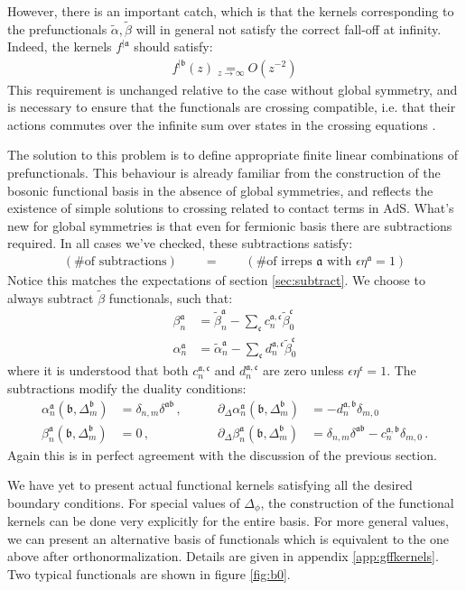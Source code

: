 \documentclass[12pt]{article}
\numberwithin{equation}{section}
\newcommand{\bea}{\begin{eqnarray}}
\newcommand{\eea}{\end{eqnarray}}
\newcommand{\ba}{\begin{equation}\begin{aligned}}
\newcommand{\ea}{\end{aligned}\end{equation}}
\newcommand{\Df}{{\Delta_\phi}}
\newcommand{\mf}[1]{\mathfrak #1}
\begin{document}
	However, there is an important catch, which is that the kernels corresponding to the prefunctionals $\tilde \alpha, \tilde \beta$ will in general not satisfy the correct fall-off at infinity. Indeed, the kernels $f^{|\mf a}$ should satisfy:
	\bea\label{ztoinf}
	f^{|\mf b}(z)\underset{z\to \infty}= O(z^{-2})
	\eea
	This requirement is unchanged relative to the case without global symmetry, and is necessary to ensure that the functionals are crossing compatible, i.e. that their actions commutes over the infinite sum over states in the crossing equations \cite{Mazac:2018mdx,Mazac:2018ycv}.
	
	The solution to this problem is to define appropriate finite linear combinations of prefunctionals. This behaviour is already familiar from the construction of the bosonic functional basis in the absence of global symmetries, and reflects the existence of simple solutions to crossing related to contact terms in AdS. What's new for global symmetries is that even for fermionic basis there are subtractions required. In all cases we've checked, these subtractions satisfy:
	\bea
	\left(\mbox{\# of subtractions}\right) \qquad = \qquad \left(\mbox{\# of irreps $\mf a$ with $\epsilon \eta^\mf a=1$}\right)
	\eea
	Notice this matches the expectations of section \ref{sec:subtract}.	We choose to always subtract $\tilde \beta$ functionals, such that:
	\ba\label{betasub}
	\beta_n^{\mf a}&= \tilde \beta_n^{\mf a}-\sum_{\mf c} c_n^{\mf a,\mf c} \tilde \beta_0^{\mf c}\\
	\alpha_n^{\mf a}&=\tilde \alpha_n^{\mf a}- \sum_{\mf c} d_n^{\mf a,\mf c} \tilde \beta_0^{\mf c}
	\ea
	where it is understood that both $c_n^{\mf a, \mf c}$ and $d_n^{\mf a, \mf c}$ are zero unless $\epsilon\eta^{\mf c} =1$. The subtractions modify the duality conditions:
	\ba
	\alpha_n^{\mf a}(\mf b,\Delta_m^{\mf b})&=\delta_{n,m} \delta^{\mf a \mf b}\,,& \qquad \partial_{\Delta}  \alpha_n^{\mf a}(\mf b,\Delta_m^{\mf b})&=-d_n^{\mf a, \mf b}\delta_{m,0}\\
	\beta_n^{\mf a}(\mf b,\Delta_m^{\mf b})&=0\,,& \qquad \partial_{\Delta}  \beta_n^{\mf a}(\mf b,\Delta_m^{\mf b})&=\delta_{n,m} \delta^{\mf a \mf b}-c_n^{\mf a, \mf b}\delta_{m,0}\,.\label{eq:correctduality}
	\ea
	Again this is in perfect agreement with the discussion of the previous section.
	
	We have yet to present actual functional kernels satisfying all the desired boundary conditions. For special values of $\Df$, the construction of the functional kernels can be done very explicitly for the entire basis. For more general values, we can present an alternative basis of functionals which is equivalent to the one above after orthonormalization. Details are given in appendix \ref{app:gffkernels}. Two typical functionals are shown in figure \ref{fig:b0}.
		
\end{document}
